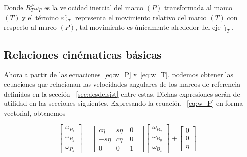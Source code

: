 Donde $R_{T}^{P}\omega _{P}$ es la velocidad inercial del marco $\left( P\right) $ transformada al marco $\left( T\right) $ y el t\'{e}rmino $\dot{\varepsilon }\hat{\jmath}_{T}$ representa el movimiento relativo del marco $\left( T\right) $ con respecto al marco $\left( P\right) $, tal movimiento es \'{u}nicamente alrededor del eje $\hat{\jmath}_{T}$.

\subsection{Relaciones cin\'{e}maticas b\'{a}sicas}\label{sec:RelCinBas}

Ahora a partir de las ecuaciones~\ref{eq:w_P} y~\ref{eq:w_T}, podemos obtener las ecuaciones que relacionan las velocidades angulares de los marcos de referencia definidos en la secci\'{o}n ~\ref{sec:desdelsist} entre estas, Dichas expresiones ser\'{a}n de utilidad en las secciones siguientes. Expresando la ecuaci\'{o}n ~\ref{eq:w_P} en forma vectorial, obtenemos

\begin{equation}
\left[\begin{array}{c} \omega_{P_x} \\\omega_{P_y} \\ \omega_{P_z} \end{array}\right] =
\left[\begin{array}{ccc} c\eta & s\eta & 0 \\  -s\eta & c\eta & 0 \\  0\text{\ \ \ } & 0\text{\ \ } & 1\text{ }\end{array} \right]
\left[\begin{array}{c} \omega_{B_x} \\\omega_{B_y} \\ \omega_{B_z} \end{array}\right] +
\left[\begin{array}{c} 0 \\0 \\ \dot{\eta } \end{array}\right]
\label{eq:w_P_vectf}
\end{equation}


